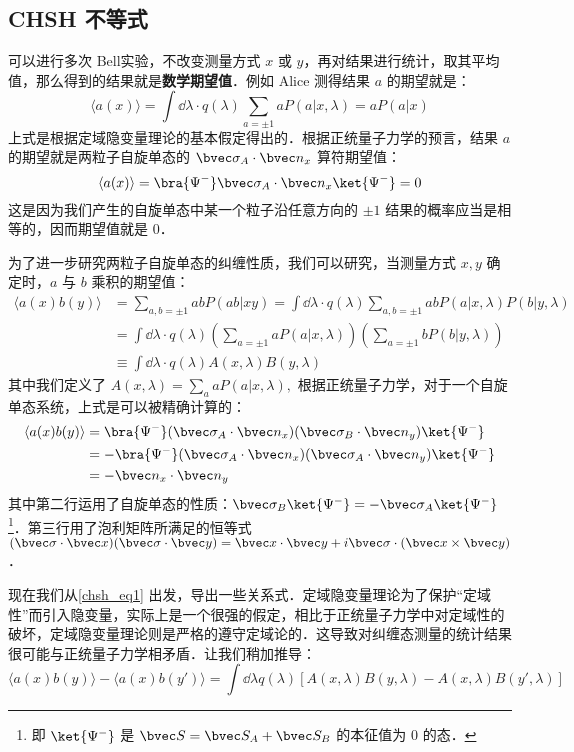 \subsection{CHSH 不等式}
可以进行多次 Bell实验，不改变测量方式 $x$ 或 $y$，再对结果进行统计，取其平均值，那么得到的结果就是\textbf{数学期望值}．例如 Alice 测得结果 $a$ 的期望就是：
\begin{equation}
\langle a(x) \rangle =\int \dd \lambda \cdot q(\lambda) \sum_{a=\pm 1}a P(a|x,\lambda) = a P(a|x)
\end{equation}
上式是根据定域隐变量理论的基本假定得出的．根据正统量子力学的预言，结果 $a$ 的期望就是两粒子自旋单态的 $\bvec \sigma_A\cdot \bvec n_x$ 算符期望值：
\begin{equation}
\langle a(x)\rangle = \bra{\Psi^-} \bvec \sigma_A \cdot \bvec n_x \ket{\Psi^-} = 0
\end{equation}
这是因为我们产生的自旋单态中某一个粒子沿任意方向的 $\pm 1$ 结果的概率应当是相等的，因而期望值就是 $0$．

为了进一步研究两粒子自旋单态的纠缠性质，我们可以研究，当测量方式 $x,y$ 确定时，$a$ 与 $b$ 乘积的期望值：
\begin{equation}\label{chsh_eq1}
\begin{aligned}
\langle a(x)b(y)\rangle &= \sum_{a,b=\pm 1} ab P(ab|xy)=\int \dd\lambda \cdot q(\lambda) \sum_{a,b=\pm 1}abP(a|x,\lambda)P(b|y,\lambda)\\
&=\int \dd\lambda \cdot q(\lambda) \left(\sum_{a=\pm 1}aP(a|x,\lambda)\right)\left(\sum_{a=\pm 1}bP(b|y,\lambda)\right)\\
&\equiv \int \dd\lambda\cdot q(\lambda) A(x,\lambda) B(y,\lambda)
\end{aligned}
\end{equation}
其中我们定义了 $A(x,\lambda)=\sum_a aP(a|x,\lambda),$
根据正统量子力学，对于一个自旋单态系统，上式是可以被精确计算的：
\begin{equation}
\begin{aligned}
\langle a(x)b(y)\rangle &= \bra{\Psi^-} (\bvec \sigma_A\cdot \bvec n_x)(\bvec \sigma_B\cdot \bvec n_y)\ket{\Psi^-}\\
&=-\bra{\Psi^-} (\bvec \sigma_A\cdot \bvec n_x)(\bvec \sigma_A\cdot \bvec n_y)\ket{\Psi^-}\\
&=-\bvec n_x\cdot \bvec n_y
\end{aligned}
\end{equation}
其中第二行运用了自旋单态的性质：$\bvec \sigma_B\ket{\Psi^-}=-\bvec \sigma_A\ket{\Psi^-}$ \footnote{即 $\ket{\Psi^-}$  是 $\bvec S=\bvec S_A+\bvec S_B$ 的本征值为 $0$ 的态．}．第三行用了泡利矩阵所满足的恒等式 $(\bvec \sigma \cdot \bvec x)(\bvec \sigma\cdot \bvec y)=\bvec x\cdot \bvec y+i\bvec \sigma\cdot (\bvec x\times \bvec y)$．

现在我们从\autoref{chsh_eq1} 出发，导出一些关系式．定域隐变量理论为了保护“定域性”而引入隐变量，实际上是一个很强的假定，相比于正统量子力学中对定域性的破坏，定域隐变量理论则是严格的遵守定域论的．这导致对纠缠态测量的统计结果很可能与正统量子力学相矛盾．让我们稍加推导：
\begin{equation}
\langle a(x) b(y)\rangle - \langle a(x)b(y')\rangle = \int \dd\lambda q(\lambda) [A(x,\lambda)B(y,\lambda)-A(x,\lambda)B(y',\lambda)]
\end{equation}
